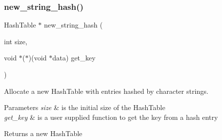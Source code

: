 \subsubsection{\texorpdfstring{new\+\_\+string\+\_\+hash()}{new\_string\_hash()}}
{\footnotesize\ttfamily Hash\+Table $\ast$ new\+\_\+string\+\_\+hash (\begin{DoxyParamCaption}\item[{int}]{size,  }\item[{void $\ast$($\ast$)(void $\ast$data)}]{get\+\_\+key }\end{DoxyParamCaption})}



Allocate a new Hash\+Table with entries hashed by character strings. 


\begin{DoxyParams}{Parameters}
{\em size} & is the initial size of the Hash\+Table \\
\hline
{\em get\+\_\+key} & is a user supplied function to get the key from a hash entry \\
\hline
\end{DoxyParams}
\begin{DoxyReturn}{Returns}
a new Hash\+Table 
\end{DoxyReturn}
